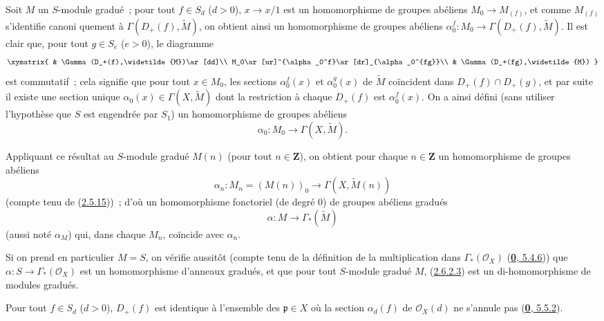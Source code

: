\begin{env}[2.6.2]
\label{II.2.6.2-fr}
Soit $M$ un $S$-module gradué~; pour tout $f\in S_d$ ($d>0$),
$x\to x/1$ est un homomorphisme de groupes abéliens
$M_0\to M_{(f)}$, et comme $M_{(f)}$ s'identifie canoni%
quement à $\Gamma(D_+(f),\widetilde{M})$, on obtient ainsi un
homomorphisme de groupes abéliens
$\alpha_0^f:M_0\to\Gamma(D_+(f),\widetilde{M})$.
Il est clair que, pour tout $g\in S_e$ ($e>0$), le diagramme
\[
  \xymatrix{
    & \Gamma(D_+(f),\widetilde{M})\ar[dd]\\
    M_0\ar[ur]^{\alpha_0^f}\ar[dr]_{\alpha_0^{fg}}\\
    & \Gamma(D_+(fg),\widetilde{M})
  }
\]
est commutatif~; cela signifie que pour tout $x\in M_0$, les sections
$\alpha_0^f(x)$ et $\alpha_0^g(x)$ de $\widetilde{M}$ coïncident dans
$D_+(f)\cap D_+(g)$, et par suite il existe une section unique
$\alpha_0(x)\in\Gamma(X,\widetilde{M})$ dont la restriction à chaque
$D_+(f)$ est $\alpha_0^f(x)$. On a ainsi défini (sans utiliser l'hypothèse
que $S$ est engendrée par $S_1$) un homomorphisme de groupes abéliens
\[
\label{II.2.6.2.1-fr}
  \alpha_0:M_0\longrightarrow\Gamma(X,\widetilde{M}).
\tag{2.6.2.1}
\]

Appliquant ce résultat au $S$-module gradué $M(n)$ (pour tout
$n\in\mathbf{Z}$), on obtient pour chaque $n\in\mathbf{Z}$ un homomorphisme
de groupes abéliens
\[
\label{II.2.6.2.2-fr}
  \alpha_n:M_n=(M(n))_0\longrightarrow\Gamma(X,\widetilde{M}(n))
\tag{2.6.2.2}
\]
(compte tenu de (\hyperref[II.2.5.15-fr]{2.5.15}))~; d'où un homomorphisme
fonctoriel (de degré $0$) de groupes abéliens gradués
\[
\label{II.2.6.2.3-fr}
  \alpha:M\longrightarrow\Gamma_*(\widetilde{M})
\tag{2.6.2.3}
\]
(aussi noté $\alpha_M$) qui, dans chaque $M_n$, coïncide avec $\alpha_n$.

Si on prend en particulier $M=S$, on vérifie aussitôt (compte tenu de la
définition de la multiplication dans $\Gamma_*(\mathcal{O}_X)$
(\hyperref[0.5.4.6-fr]{\textbf{0}, 5.4.6})) que
$\alpha:S\to\Gamma_*(\mathcal{O}_X)$ est un homomorphisme d'anneaux
gradués, et que pour tout $S$-module gradué $M$,
(\hyperref[II.2.6.2.3-fr]{2.6.2.3}) est un di-homomorphisme de modules
gradués.
\end{env}

\begin{proposition}[2.6.3]
\label{II.2.6.3-fr}
Pour tout $f\in S_d$ ($d>0$), $D_+(f)$ est identique à l'ensemble des
$\mathfrak{p}\in X$ où la section $\alpha_d(f)$ de $\mathcal{O}_X(d)$ ne
s'annule pas \textup{(\hyperref[0.5.5.2-fr]{\textbf{0}, 5.5.2})}.
\end{proposition}

